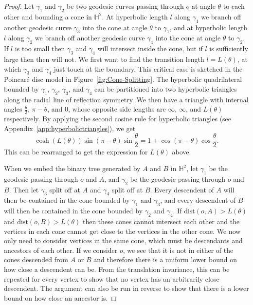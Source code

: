 \documentclass[10pt,a4paper,dvipsnames]{article}
\theoremstyle{definition}
\theoremstyle{remark}
\newcommand{\HypTwo}{{\mathbb{H}^2}}
\newcommand{\dist}[1]{\mathrm{dist}\left(#1\right)}
\newcommand{\orig}{o}
\numberwithin{equation}{section}
\begin{document}
\begin{proof}
    Let $\gamma_1$ and $\gamma_2$ be two geodesic curves passing through $\orig$ at angle $\theta$ to each other and bounding a cone in $\HypTwo$. At hyperbolic length $l$ along $\gamma_1$ we branch off another geodesic curve $\gamma_3$ into the cone at angle $\theta$ to $\gamma_1$, and at hyperbolic length $l$ along $\gamma_2$ we branch off another geodesic curve $\gamma_4$ into the cone at angle $\theta$ to $\gamma_2$. If $l$ is too small then $\gamma_3$ and $\gamma_4$ will intersect inside the cone, but if $l$ is sufficiently large then then will not. We first want to find the transition length $l=L(\theta)$, at which $\gamma_3$ and $\gamma_4$ just touch at the boundary. This critical case is sketched in the Poincar{\'e} disc model in Figure~\ref{fig:Cone-Splitting}. The hyperbolic quadrilateral bounded by $\gamma_1$, $\gamma_2$, $\gamma_3$, and $\gamma_4$ can be partitioned into two hyperbolic triangles along the radial line of reflection symmetry. We then have a triangle with internal angles $\frac{\theta}{2}$, $\pi-\theta$, and $0$, whose opposite side lengths are $\infty$, $\infty$, and $L(\theta)$ respectively. By applying the second cosine rule for hyperbolic triangles (see Appendix~\ref{app:hyperbolictriangles}), we get
    \begin{equation}
        \cosh\left(L(\theta)\right)\sin\left(\pi-\theta\right)\sin\frac{\theta}{2} = 1 + \cos\left(\pi-\theta\right)\cos\frac{\theta}{2}.
    \end{equation}
    This can be rearranged to get the expression for $L(\theta)$ above.

    When we embed the binary tree generated by $A$ and $B$ in $\HypTwo$, let $\gamma_1$ be the geodesic passing through $\orig$ and $A$, and $\gamma_2$ be the geodesic passing through $\orig$ and $B$. Then let $\gamma_3$ split off at $A$ and $\gamma_4$ split off at $B$. Every descendent of $A$ will then be contained in the cone bounded by $\gamma_1$ and $\gamma_3$, and every descendent of $B$ will then be contained in the cone bounded by $\gamma_2$ and $\gamma_4$. If $\dist{\orig,A}>L(\theta)$ and $\dist{\orig,B}>L(\theta)$ then these cones cannot intersect each other and the vertices in each cone cannot get close to the vertices in the other cone. We now only need to consider vertices in the same cone, which must be descendants and ancestors of each other. If we consider $\orig$, we see that it is not in either of the cones descended from $A$ or $B$ and therefore there is a uniform lower bound on how close a descendent can be. From the translation invariance, this can be repeated for every vertex to show that no vertex has an arbitrarily close descendent. The argument can also be run in reverse to show that there is a lower bound on how close an ancestor is.
\end{proof}
\end{document}
